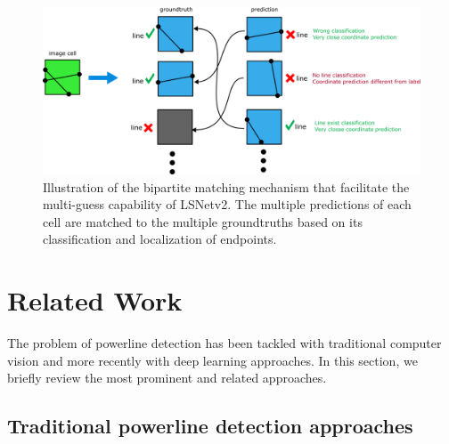\documentclass[journal]{IEEEtran}
\begin{document}
\begin{figure}[hbt!]
  \includegraphics[width=\linewidth]{imgs/others/bimatching.png}
  \caption{Illustration of the bipartite matching mechanism that facilitate the multi-guess capability of LSNetv2. The multiple predictions of each cell are matched to the multiple groundtruths based on its classification and localization of endpoints.}
  \label{bimatching}
\end{figure}


\section{Related Work}

The problem of powerline detection has been tackled with traditional computer vision and more recently with deep learning approaches. In this section, we briefly review the most prominent and related approaches.

\subsection{Traditional powerline detection approaches}
\end{document}

